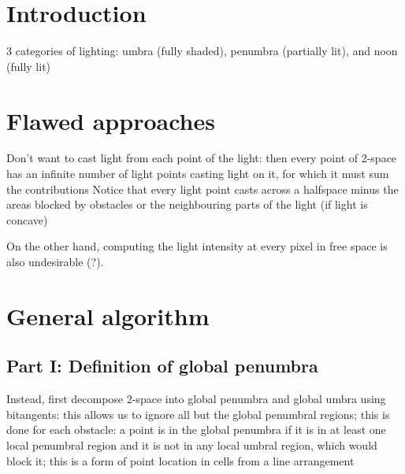 \documentclass[12pt]{article}
\begin{document}
\section{Introduction}

3 categories of lighting: umbra (fully shaded), penumbra (partially lit), 
	and noon (fully lit)

\section{Flawed approaches}

Don't want to cast light from each point of the light: 
	then every point of 2-space
	has an infinite number of light points casting light on it,
	for which it must sum the contributions
	Notice that every light point casts across a halfspace minus the
	areas blocked by obstacles or the neighbouring parts of the light (if
	light is concave)
	
On the other hand, computing the light intensity at every pixel
	in free space is also undesirable (?).
	
			
\section{General algorithm}

\subsection{Part I: Definition of global penumbra}

Instead, first decompose 2-space into global penumbra and global umbra using bitangents:
	this allows us to ignore all but the global penumbral regions;
	this is done for each obstacle: a point is in the global penumbra
	if it is in at least one local penumbral region and it is not in any
	local umbral region, which would block it;
	this is a form of point location in cells from a line arrangement
			
\end{document}
